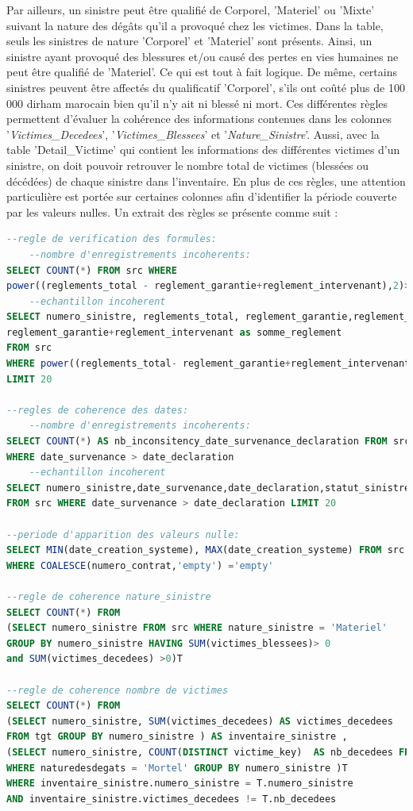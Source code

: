 Par ailleurs, un sinistre peut \^etre qualifi\'e de Corporel, 'Materiel' ou 'Mixte' suivant la nature des d\'eg\^ats qu'il a provoqu\'e chez les victimes. Dans la table, seuls les sinistres de nature 'Corporel' et 'Materiel' sont pr\'esents. Ainsi, un sinistre ayant provoqu\'e des blessures et/ou caus\'e des pertes en vies humaines ne peut \^etre qualifi\'e de 'Materiel'. Ce qui est tout \`a fait logique. De m\^eme, certains sinistres peuvent \^etre affect\'es du qualificatif 'Corporel', s'ils ont co\^ut\'e plus de 100 000 dirham marocain bien qu'il n'y ait ni bless\'e ni mort. Ces diff\'erentes r\`egles permettent d'\'evaluer la coh\'erence des informations contenues dans les colonnes '\textit{Victimes\_Decedees}', '\textit{Victimes\_Blessees}' et '\textit{Nature\_Sinistre}'. Aussi, avec la table 'Detail\_Victime' qui contient les informations des diff\'erentes victimes d'un sinistre, on doit pouvoir retrouver le nombre total de victimes (bless\'ees ou d\'ec\'ed\'ees) de chaque sinistre dans l'inventaire. En plus de ces r\`egles, une attention particuli\`ere est port\'ee sur certaines colonnes afin d'identifier la p\'eriode couverte par les valeurs nulles. Un extrait des r\`egles se pr\'esente comme suit : 
\newpage
\begin{lstlisting}[language=SQL,caption={R\`egle de la Dimension Coh\'erence pour la table \textit{Inventaire\_Sinistre}},captionpos=t,showspaces=false,basicstyle=\scriptsize,numbers=none,commentstyle=\color{gray},backgroundcolor=\color{background}]
--regle de verification des formules: 
	--nombre d'enregistrements incoherents:
SELECT COUNT(*) FROM src WHERE 
power((reglements_total - reglement_garantie+reglement_intervenant),2)>1
	--echantillon incoherent
SELECT numero_sinistre, reglements_total, reglement_garantie,reglement_intervenant,
reglement_garantie+reglement_intervenant as somme_reglement 
FROM src 
WHERE power((reglements_total- reglement_garantie+reglement_intervenant),2)>1 
LIMIT 20

--regles de coherence des dates:
	--nombre d'enregistrements incoherents:
SELECT COUNT(*) AS nb_inconsitency_date_survenance_declaration FROM src 
WHERE date_survenance > date_declaration 
	--echantillon incoherent
SELECT numero_sinistre,date_survenance,date_declaration,statut_sinistre 
FROM src WHERE date_survenance > date_declaration LIMIT 20

--periode d'apparition des valeurs nulle:
SELECT MIN(date_creation_systeme), MAX(date_creation_systeme) FROM src 
WHERE COALESCE(numero_contrat,'empty') ='empty'

--regle de coherence nature_sinistre
SELECT COUNT(*) FROM  
(SELECT numero_sinistre FROM src WHERE nature_sinistre = 'Materiel' 
GROUP BY numero_sinistre HAVING SUM(victimes_blessees)> 0 
and SUM(victimes_decedees) >0)T

--regle de coherence nombre de victimes
SELECT COUNT(*) FROM 
(SELECT numero_sinistre, SUM(victimes_decedees) AS victimes_decedees 
FROM tgt GROUP BY numero_sinistre ) AS inventaire_sinistre ,
(SELECT numero_sinistre, COUNT(DISTINCT victime_key)  AS nb_decedees FROM src 
WHERE naturedesdegats = 'Mortel' GROUP BY numero_sinistre )T 
WHERE inventaire_sinistre.numero_sinistre = T.numero_sinistre 
AND inventaire_sinistre.victimes_decedees != T.nb_decedees
\end{lstlisting}

